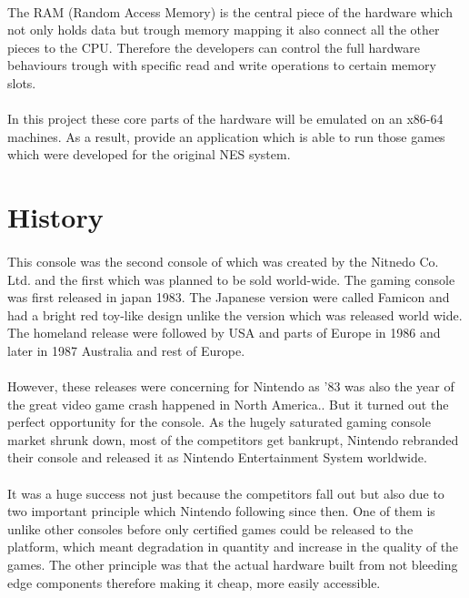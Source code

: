 \documentclass[]{report}
\begin{document}
\paragraph{ }
The RAM (Random Access Memory) is the central piece of the hardware which not only holds data but 
trough memory mapping it also connect all the other pieces to the CPU. Therefore the developers can control the full hardware behaviours trough with specific read and write operations to certain memory slots.
\paragraph{ }
In this project these core parts of the hardware will be emulated on an x86-64 machines. As a result, provide an application which is able to run those games which were developed for the original NES system.


\section{History}

\paragraph{ }
 This console was the second console of which was created by the Nitnedo Co. Ltd. and the first which was planned to be sold world-wide. \cite{HIST}
The gaming console was first released in japan 1983. The Japanese version were called Famicon and had  a bright red toy-like design unlike the version which was released world wide.
The homeland release were followed by USA and parts of Europe in 1986 and later in 1987 Australia and rest of Europe.
\paragraph{ }
However, these releases were concerning for Nintendo as '83 was also the year of the great video game crash happened in North America.\cite{CRSH}. But it turned out the perfect opportunity for the console. As the hugely saturated gaming console market shrunk down, most of the competitors get bankrupt, Nintendo rebranded their console and released it as Nintendo Entertainment System worldwide.
\paragraph{ }
 It was a huge success not just because the competitors fall out but also due to two important principle which Nintendo following since then. One of them is unlike other consoles before only certified games could be released to the platform, which meant degradation in quantity and increase in the quality of the games. The other principle was that the actual hardware built from not bleeding edge components therefore making it cheap, more easily accessible.
\end{document}
